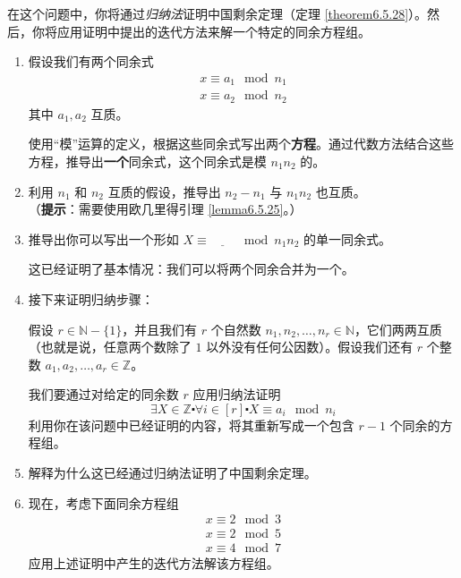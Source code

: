 \begin{exercise}\label{exc:exercises6.7.26}
    在这个问题中，你将通过\emph{归纳法}证明中国剩余定理（定理 \ref{theorem6.5.28}）。然后，你将应用证明中提出的迭代方法来解一个特定的同余方程组。
    \begin{enumerate}[label=(\alph*)]
        \item 假设我们有两个同余式
        \begin{align*}
            x \equiv a_1 \mod n_1\\
            x \equiv a_2 \mod n_2
        \end{align*}
        其中 $a_1, a_2$ 互质。

        使用``模''运算的定义，根据这些同余式写出两个\textbf{方程}。通过代数方法结合这些方程，推导出\textbf{一个}同余式，这个同余式是模 $n_1n_2$ 的。
        \item 利用 $n_1$ 和 $n_2$ 互质的假设，推导出 $n_2 - n_1$ 与 $n_1n_2$ 也互质。\\
        （\textbf{提示}：需要使用欧几里得引理 \ref{lemma6.5.25}。）
        \item 推导出你可以写出一个形如 $X \equiv \underline{\qquad} \mod n_1n_2$ 的单一同余式。
        
            这已经证明了基本情况：我们可以将两个同余合并为一个。
        \item 接下来证明归纳步骤：

            假设 $r \in \mathbb{N} - \{1\}$，并且我们有 $r$ 个自然数 $n_1, n_2, \dots , n_r \in \mathbb{N}$，它们两两互质（也就是说，任意两个数除了 $1$ 以外没有任何公因数）。假设我们还有 $r$ 个整数 $a_1, a_2, \dots , a_r \in \mathbb{Z}$。

            我们要通过对给定的同余数 $r$ 应用归纳法证明
            \[\exists X \in \mathbb{Z} \centerdot \forall i \in [r] \centerdot X \equiv a_i \mod n_i\]
            利用你在该问题中已经证明的内容，将其重新写成一个包含 $r-1$ 个同余的方程组。
        \item 解释为什么这已经通过归纳法证明了中国剩余定理。
        \item 现在，考虑下面同余方程组
            \begin{align*}
                x \equiv 2 \mod 3 \\
                x \equiv 2 \mod 5 \\
                x \equiv 4 \mod 7
            \end{align*}
            应用上述证明中产生的迭代方法解该方程组。
    \end{enumerate}
\end{exercise}

